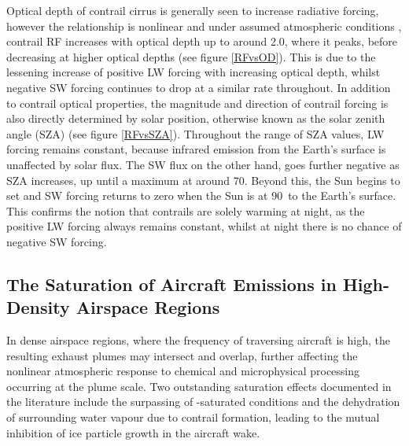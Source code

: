 Optical depth of contrail cirrus is generally seen to increase radiative forcing, however the relationship is nonlinear and under assumed atmospheric conditions \cite{Meerkotter1999, Schumann2012b}, contrail RF increases with optical depth up to around 2.0, where it peaks, before decreasing at higher optical depths (see figure \ref{RFvsOD}). This is due to the lessening increase of positive LW forcing with increasing optical depth, whilst negative SW forcing continues to drop at a similar rate throughout. In addition to contrail optical properties, the magnitude and direction of contrail forcing is also directly determined by solar position, otherwise known as the solar zenith angle (SZA) (see figure \ref{RFvsSZA}). Throughout the range of SZA values, LW forcing remains constant, because infrared emission from the Earth's surface is unaffected by solar flux. The SW flux on the other hand, goes further negative as SZA increases, up until a maximum at around 70\textdegree. Beyond this, the Sun begins to set and SW forcing returns to zero when the Sun is at 90\textdegree \ to the Earth's surface. This confirms the notion that contrails are solely warming at night, as the positive LW forcing always remains constant, whilst at night there is no chance of negative SW forcing.

\subsection{The Saturation of Aircraft Emissions in High-Density Airspace Regions}
\label{Saturation}
In dense airspace regions, where the frequency of traversing aircraft is high, the resulting exhaust plumes may intersect and overlap, further affecting the nonlinear atmospheric response to chemical and microphysical processing occurring at the plume scale. Two outstanding saturation effects documented in the literature include the surpassing of -saturated conditions and the dehydration of surrounding water vapour due to contrail formation, leading to the mutual inhibition of ice particle growth in the aircraft wake.

